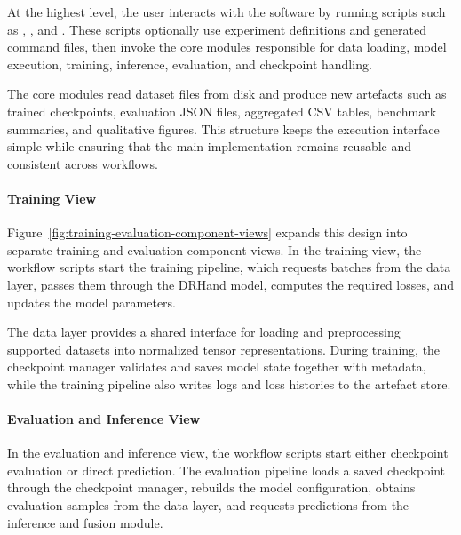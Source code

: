 ﻿\documentclass[11pt,a4paper]{article}
\begin{document}
\medskip

\noindent
At the highest level, the user interacts with the software by running scripts
such as , , and
. These scripts optionally use experiment
definitions and generated command files, then invoke the core modules
responsible for data loading, model execution, training, inference,
evaluation, and checkpoint handling.

\medskip

\noindent
The core modules read dataset files from disk and produce new artefacts such
as trained checkpoints, evaluation JSON files, aggregated CSV tables,
benchmark summaries, and qualitative figures. This structure keeps the
execution interface simple while ensuring that the main implementation remains
reusable and consistent across workflows.

\paragraph*{Training View}

Figure~\ref{fig:training-evaluation-component-views} expands this design into
separate training and evaluation component views. In the training view, the
workflow scripts start the training pipeline, which requests batches from the
data layer, passes them through the DRHand model, computes the required
losses, and updates the model parameters.

\medskip

\noindent
The data layer provides a shared interface for loading and preprocessing
supported datasets into normalized tensor representations. During training,
the checkpoint manager validates and saves model state together with metadata,
while the training pipeline also writes logs and loss histories to the
artefact store.

\paragraph*{Evaluation and Inference View}

In the evaluation and inference view, the workflow scripts start either
checkpoint evaluation or direct prediction. The evaluation pipeline loads a
saved checkpoint through the checkpoint manager, rebuilds the model
configuration, obtains evaluation samples from the data layer, and requests
predictions from the inference and fusion module.

\medskip
\end{document}
